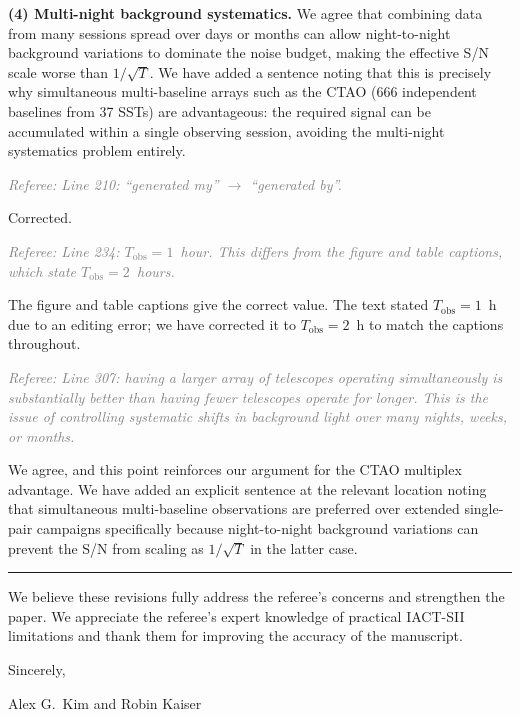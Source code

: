 \documentclass[12pt]{article}
\newcommand{\referee}[1]{\medskip\noindent\textit{\textcolor{gray}{Referee: #1}}\medskip}
\newcommand{\response}[1]{\noindent #1\medskip}
\begin{document}
{\medskip
\noindent\textbf{(4) Multi-night background systematics.}
We agree that combining data from many sessions spread over days or months can allow
night-to-night background variations to dominate the noise budget, making the effective
S/N scale worse than $1/\sqrt{T}$.  We have added a sentence noting that this is precisely
why simultaneous multi-baseline arrays such as the CTAO (666 independent baselines from 37
SSTs) are advantageous: the required signal can be accumulated within a single observing
session, avoiding the multi-night systematics problem entirely.}

\bigskip
\referee{Line 210: ``generated my'' $\to$ ``generated by''.}

\response{Corrected.}

\bigskip
\referee{Line 234: $T_\mathrm{obs} = 1$~hour. This differs from the figure and table
captions, which state $T_\mathrm{obs} = 2$~hours.}

\response{The figure and table captions give the correct value.
The text stated $T_\mathrm{obs}=1$~h due to an editing error; we have corrected it to
$T_\mathrm{obs}=2$~h to match the captions throughout.}

\bigskip
\referee{Line 307: having a larger array of telescopes operating simultaneously is
substantially better than having fewer telescopes operate for longer. This is the issue
of controlling systematic shifts in background light over many nights, weeks, or months.}

\response{We agree, and this point reinforces our argument for the CTAO multiplex
advantage.  We have added an explicit sentence at the relevant location noting that
simultaneous multi-baseline observations are preferred over extended single-pair
campaigns specifically because night-to-night background variations can prevent the
S/N from scaling as $1/\sqrt{T}$ in the latter case.}

\bigskip
\hrule
\bigskip

\noindent We believe these revisions fully address the referee's concerns and strengthen
the paper. We appreciate the referee's expert knowledge of practical IACT-SII limitations
and thank them for improving the accuracy of the manuscript.

\bigskip
\noindent Sincerely,

\noindent Alex G.\ Kim and Robin Kaiser



\end{document}
